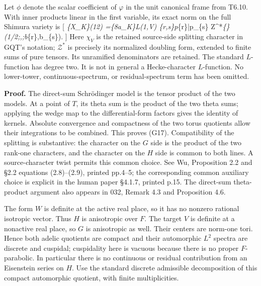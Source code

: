 \documentclass[11pt,a4paper]{article}
\theoremstyle{definition}
\begin{document}
Let \(\phi\) denote the scalar coefficient of \(\varphi\) in the unit
canonical frame from T6.10. With inner products linear in the first
variable, its exact norm on the full Shimura variety is {[}
\int\emph{\{X\_K\}(\Theta\emph{1\wedge\Theta\emph{2)\wedge
{}
=\{8\over a\_K\}\sum}\lambda L(1,\pi}\lambda\times\chi\emph{V)
\sum}\{r,s\}p}\{\lambda r\}\bar p\_\{\lambda s\}
\mathcal Z\^{}*\emph{\{\lambda\}(1/2;\phi,\phi;b}\{\lambda r\},b\_\{\lambda s\}).
 {]} Here \(\chi_V\) is the retained source-side splitting
character in GQT's notation; \(\mathcal Z^*\) is precisely its
normalized doubling form, extended to finite sums of pure tensors. Its
unramified denominators are retained. The standard \(L\)-function has
degree two. It is not in general a Hecke-character \(L\)-function. No
lower-tower, continuous-spectrum, or residual-spectrum term has been
omitted.

\textbf{Proof.} The direct-sum Schrödinger model is the tensor product
of the two models. At a point of \(T\), its theta sum is the product of
the two theta sums; applying the wedge map to the differential-form
factors gives the identity of kernels. Absolute convergence and
compactness of the two torus quotients allow their integrations to be
combined. This proves (G17). Compatibility of the splitting is
substantive: the character on the \(G\) side is the product of the two
rank-one characters, and the character on the \(H\) side is common to
both lines. A source-character twist permits this common choice. See Wu,
Proposition 2.2 and §2.2 equations (2.8)--(2.9), printed pp.4--5; the
corresponding common auxiliary choice is explicit in the human paper
§4.1.7, printed p.15. The direct-sum theta-product argument also appears
in 032, Remark 4.3 and Proposition 4.6.

The form \(W\) is definite at the active real place, so it has no
nonzero rational isotropic vector. Thus \(H\) is anisotropic over \(F\).
The target \(V\) is definite at a nonactive real place, so \(G\) is
anisotropic as well. Their centers are norm-one tori. Hence both adelic
quotients are compact and their automorphic \(L^2\) spectra are discrete
and cuspidal; cuspidality here is vacuous because there is no proper
\(F\)-parabolic. In particular there is no continuous or residual
contribution from an Eisenstein series on \(H\). Use the standard
discrete admissible decomposition of this compact automorphic quotient,
with finite multiplicities.
\end{document}
